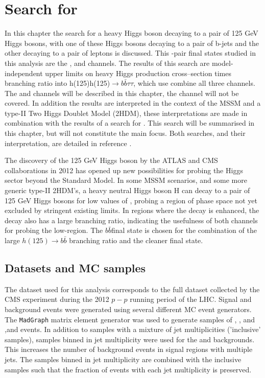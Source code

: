 \chapter{\texorpdfstring{Search for \Htohhtobbtautau}{Search for H -> hh -> bbtautau}}
\label{sec:hhh}

In this chapter the search for a heavy Higgs boson decaying to a pair of 125 GeV Higgs bosons, with one of these Higgs bosons decaying to 
a pair of b-jets and the other decaying to a pair of \Ptau leptons is discussed. This \Pgt-pair final states studied in this analysis
are the \etau, \mutau and \tautau channels. The results of this search are model-independent
upper limits on heavy Higgs production cross--section times branching ratio into h(125)h(125)$\rightarrow b\bar{b} \tau\tau$, which use
combine all three channels. The \etau and \mutau channels will be described in this chapter, the \tautau channel will not
be covered. In addition  the results are interpreted in the context of the MSSM and a type-II Two Higgs Doublet Model (2HDM), 
these interpretations are made in combination with the results of a search for \AtoZhtolltautau. 
This search will be summarised in this chapter, but will not constitute the main focus.
Both searches, and their interpretation, are detailed in reference \cite{CMS-HIG-14-034}.

The discovery of the 125 GeV Higgs boson by the ATLAS and CMS collaborations in 2012 \cite{HDiscoveryAtlas,HDiscoveryCMS} has opened up
new possibilities for probing the Higgs sector beyond the Standard Model. In some MSSM scenarios, and some more
generic type-II 2HDM's, a heavy neutral Higgs boson H can decay to a pair of 125 GeV Higgs bosons for low values
of \tanb, probing a region of phase space not yet excluded by stringent existing limits. In regions where
the decay \Htohh is enhanced, the \AtoZh decay also has a large branching ratio, indicating the usefulness
of both channels for probing the low-\tanb region. The $b\bar{b}$\tautau final state is chosen for the combination
of the large $h(125) \rightarrow b\bar{b}$ branching ratio and the cleaner \htotautau final state.

\section{Datasets and \acl{MC} samples}
\label{sec:hhh_datasets}
The dataset used for this analysis corresponds to the full dataset collected by the CMS experiment during the 2012 $p-p$ 
running period of the LHC. 
Signal and background events were generated using several different \ac{MC} event generators. The \texttt{MadGraph}
\cite{madgraph} matrix element generator was used to generate samples of \Wjets, \Zellell, \ttbar and \ZZ ,\WZ and \WW
events. In addition to samples with a mixture of jet multiplicities ('inclusive' samples), samples binned in jet multiplicity
were used for the \Wjets and \Zellell backgrounds. This increases the number of background events
in signal regions with multiple jets. The samples binned in jet multiplicity are combined with the
inclusive samples such that the fraction of events with each jet multiplicity is preserved.


